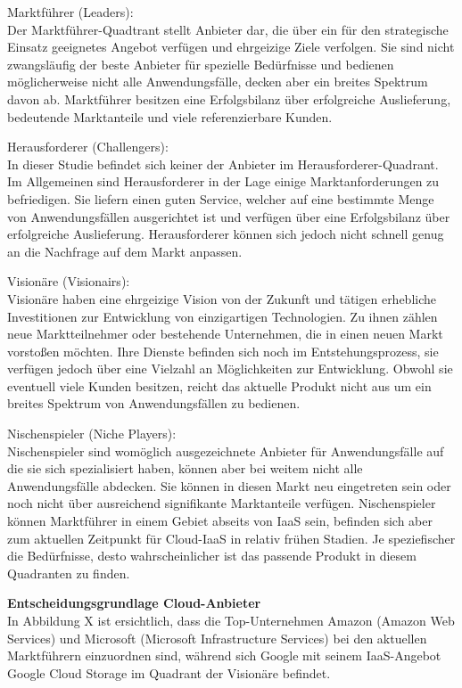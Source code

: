 \documentclass[12pt,a4paper,bibliography=totocnumbered,listof=totocnumbered]{scrartcl}
\begin{document}
\begin{compactitem}
\item{Marktführer (Leaders):}
\\Der Marktführer-Quadtrant stellt Anbieter dar, die über ein für den strategische Einsatz geeignetes Angebot verfügen und ehrgeizige Ziele verfolgen. Sie sind nicht zwangsläufig der beste Anbieter für spezielle Bedürfnisse und bedienen möglicherweise nicht alle Anwendungsfälle, decken aber ein breites Spektrum davon ab. Marktführer besitzen eine Erfolgsbilanz über erfolgreiche Auslieferung, bedeutende Marktanteile und viele referenzierbare Kunden.
\item{Herausforderer (Challengers):}
\\In dieser Studie befindet sich keiner der Anbieter im Herausforderer-Quadrant. Im Allgemeinen sind Herausforderer in der Lage einige Marktanforderungen zu befriedigen. Sie liefern einen guten Service, welcher auf eine bestimmte Menge von Anwendungsfällen ausgerichtet ist und verfügen über eine Erfolgsbilanz über erfolgreiche Auslieferung. Herausforderer können sich jedoch nicht schnell genug an die Nachfrage auf dem Markt anpassen.
\item{Visionäre (Visionairs):}
\\Visionäre haben eine ehrgeizige Vision von der Zukunft und tätigen erhebliche Investitionen zur Entwicklung von einzigartigen Technologien. Zu ihnen zählen neue Marktteilnehmer oder bestehende Unternehmen, die in einen neuen Markt vorstoßen möchten. Ihre Dienste befinden sich noch im Entstehungsprozess, sie verfügen jedoch über eine Vielzahl an Möglichkeiten zur Entwicklung. Obwohl sie eventuell viele Kunden besitzen, reicht das aktuelle Produkt nicht aus um ein breites Spektrum von Anwendungsfällen zu bedienen.
\item{Nischenspieler (Niche Players):}
\\Nischenspieler sind womöglich ausgezeichnete Anbieter für Anwendungsfälle auf die sie sich spezialisiert haben, können aber bei weitem nicht alle Anwendungsfälle abdecken. Sie können in diesen Markt neu eingetreten sein oder noch nicht über ausreichend signifikante Marktanteile verfügen. Nischenspieler können Marktführer in einem Gebiet abseits von IaaS sein, befinden sich aber zum aktuellen Zeitpunkt für Cloud-IaaS in relativ frühen Stadien. Je speziefischer die Bedürfnisse, desto wahrscheinlicher ist das passende Produkt in diesem Quadranten zu finden.
\end{compactitem}

\textbf{Entscheidungsgrundlage Cloud-Anbieter}\\
In Abbildung X ist ersichtlich, dass die Top-Unternehmen Amazon (Amazon Web Services) und Microsoft (Microsoft Infrastructure Services) bei den aktuellen Marktführern einzuordnen sind, während sich Google mit seinem IaaS-Angebot Google Cloud Storage im Quadrant der Visionäre befindet.
\end{document}
